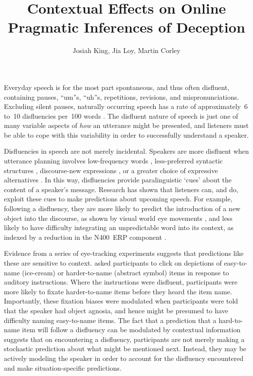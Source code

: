 \documentclass[a4paper,man,natbib]{apa6}
\title{Contextual Effects on Online Pragmatic Inferences of Deception}
\author{Josiah King, Jia Loy, Martin Corley}
\affiliation{Psychology, PPLS, University of Edinburgh}
\newcommand*{\spex}[1]{``{#1}''} %
\begin{document}
\maketitle


\noindent
Everyday speech is for the most part spontaneous, and thus often disfluent, containing pauses, \spex{um}s, \spex{uh}s, repetitions, revisions, and mispronunciations.
Excluding silent pauses, naturally occurring speech has a rate of approximately~6 to~10 disfluencies per~100 words \citep{Bortfeld2001,FoxTree1995}.
The disfluent nature of speech is just one of many variable aspects of \emph{how} an utterance might be presented, and listeners must be able to cope with this variability in order to successfully understand a speaker.

Disfluencies in speech are not merely incidental.  
Speakers are more disfluent when utterance planning involves low-frequency words \citep{Beattie1979}, less-preferred syntactic structures \citep{Cook2009}, discourse-new expressions \citep{arnold2000heaviness}, or a greater choice of expressive alternatives \citep{Schachter1991}.
In this way, disfluencies provide paralinguistic `cues' about the content of a speaker's message.
Research has shown that listeners can, and do, exploit these cues to make predictions about upcoming speech.
For example, following a disfluency, they are more likely to predict the introduction of a new object into the discourse, as shown by visual world eye movements \citep{Arnold2004}, and less likely to have difficulty integrating an unpredictable word into its context, as indexed by a reduction in the N400~ERP component \citep{Corley2007}.

Evidence from a series of eye-tracking experiments suggests that predictions like these are sensitive to context.
\citet{Arnold2007} asked participants to click on depictions of easy-to-name (ice-cream) or harder-to-name (abstract symbol) items in response to auditory instructions.
Where the instructions were disfluent, participants were more likely to fixate harder-to-name items before they heard the item name.
Importantly, these fixation biases were modulated when participants were told that the speaker had object agnosia, and hence might be presumed to have difficulty naming easy-to-name items.
The fact that a prediction that a hard-to-name item will follow a disfluency can be modulated by contextual information suggests that on encountering a disfluency, participants are not merely making a stochastic prediction about what might be mentioned next.
Instead, they may be actively modeling the speaker in order to account for the disfluency encountered and make situation-specific predictions.
\end{document}
